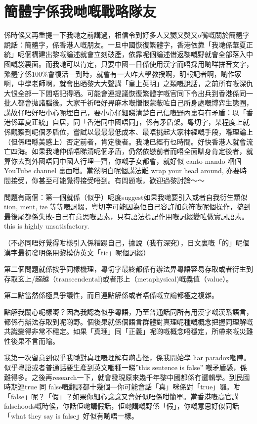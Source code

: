 \documentclass[a5paper, 10pt, openany]{book} %
\begin{document}
\chapter{簡體字係我哋嘅戰略隊友}

係時候又再重提一下我哋之前講過，相信令到好多人又嬲又㷫又o嘴嘅關於簡體字說話：簡體字，係香港人嘅朋友。一旦中國恢復繁體字，香港依靠「我哋係華夏正統」呢個構建出黎嘅論述就會立刻破產，依靠呢個論述借返黎嘅野就會全部落入中國嘅袋裏面。而我哋可以肯定，只要中國一日係使用漢字而唔採用啲咩拼音文字，繁體字係100\%會復活—到時，就會有一大咋大學教授啊，明報記者啊，啲作家啊，中學老師啊，就會出晒黎大大聲講「皇上英明」之類嘅說話，之前所有嘅深仇大恨全部一下間唔記得晒。可能會連提議恢復繁體字嘅官同下令出兵到香港係同一批人都會拋諸腦後。大家千祈唔好畀麻木嘅憎恨蒙蔽咗自己所身處嘅博弈生態圈，講故仔唔好唔小心呃埋自己，要小心仔細睇清楚自己信嘅野內裏有冇矛盾：以「香港係華夏正統」自居，同「香港同中國唔同」，係有矛盾架。粵切字，某程度上就係觀察到呢個矛盾位，嘗試以最最最低成本、最唔挑起大家神經嘅手段，喺理論上（但係唔喺美感上）否定前者，肯定後者。我哋已經冇乜時間。好快香港人就會流亡四海。如果我哋仲係唔睇清呢個矛盾，仍然依戀前者而唔全面瞓身肯定後者，就算你去到外國唔同中國人行埋一齊，你嘅子女都會，就好似 canto-mando 嗰個 YouTube channel 裏面咁。當然明白呢個講法難 wrap your head around, 亦要時間接受，你甚至可能覺得接受唔到。有問題嘅，歡迎過黎討論～～


問題有兩個：第一個就係（似乎）呢度suggest如果我哋要引入或者自我衍生類似 tion, ment, ize 等等嘅詞綴，粵切字可能因為佢自己容許加意符嘅呢個操作，搞到最後尾都係失敗-自己冇意思嘅語素，只有語法標記作用嘅詞綴變咗做實詞語素。this is highly unsatisfactory.

（不必同唔好覺得咁樣引入係糟蹋自己，據說（我冇深究），日文裏嘅「的」呢個漢字最初發明係用黎模仿英文「tic」呢個詞綴）

第二個問題就係按乎同樣機理，粵切字最終都係冇辦法畀粵語容易存取或者衍生到存取玄上/超越（transcendental)或者形上（metaphysical)嘅義值（value）。

第二點當然係極具爭議性，而且連點解係或者唔係嘅立論都極之複雜。

點解我關心呢樣嘢？因為我認為似乎粵語，乃至普通話同所有用漢字嘅漢系語言，都係冇辦法存取到呢啲野。個後果就係個語言群體對真理呢種嘅概念把握同理解嘅共識變得非常不穩定。如果「真理」同「正義」呢啲嘅概念唔穩定，所帶來嘅災難性後果不言而喻。

我第一次留意到似乎我哋對真理嘅理解有啲古怪，係我開始學 liar paradox嗰陣。似乎粵語或者普通話要生產到英文嗰種一睇”this sentence is false” 嘅矛盾感，係難得多。之後再research一下，就會發現原來幾千年黎中國都係冇邏輯學。到民國時期連true 同 false嘅翻譯都十幾個—你可能會話「真」咪係對「true」囉。咁「false」呢？「假」？如果你細心諗諗又會好似唔係咁簡單。當香港嘅高官講 falsehoods嘅時候，你話佢哋講假話，佢哋講嘅野係「假」，你嘅意思好似同話「what they say is false」好似有啲唔一樣。
\end{document}
